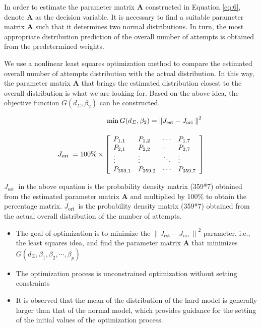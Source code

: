 \documentclass[12pt]{mcmthesis}
\begin{document}
In order to estimate the parameter matrix $ \boldsymbol{A} $ constructed in Equation \ref{eq:6}, denote $ \boldsymbol{A} $ as the decision variable. It is necessary to find a suitable parameter matrix $ \boldsymbol{A} $ such that it determines two normal distributions. In turn, the most appropriate distribution prediction of the overall number of attempts is obtained from the predetermined weights.

We use a nonlinear least squares optimization method to compare the estimated overall number of attempts distribution with the actual distribution. In this way, the parameter matrix $ \boldsymbol{A} $ that brings the estimated distribution closest to the overall distribution is what we are looking for. Based on the above idea, the objective function $ G(d_{\varSigma }, \beta_2) $ can be constructed.

\begin{equation}\label{eq:9}
\begin{array}{r}
	\min G(d_{\varSigma }, \beta_2)=\left\|J_{\text {est}}-J_{\text {ori }}\right\|^2 ~\\
	\vspace{0.2em}\\
	J_{\text {est }}=100\% \times\left[\begin{array}{llll}
		P_{1,1} & P_{1,2} & \cdots & P_{1,7} \\
		P_{2,1} & P_{2,2} & \cdots & P_{2,7} \\
		\vdots & \vdots & \ddots & \vdots \\
		P_{359,1} & P_{359,2} & \cdots & P_{359,7}
	\end{array}\right]
\end{array}
\end{equation}

$ J_{\text {est }} $ in the above equation is the probability density matrix (359*7) obtained from the estimated parameter matrix $ \boldsymbol{A} $ and multiplied by 100\% to obtain the percentage matrix. $ J_{\text {ori }} $ is the probability density matrix (359*7) obtained from the actual overall distribution of the number of attempts.
\begin{itemize}
	\item The goal of optimization is to minimize the $ \left\|J_{\text {est}}-J_{\text {ori }}\right\|^2 $ parameter, i.e., the least squares idea, and find the parameter matrix $ \boldsymbol{A} $ that minimizes $ G(d_{\varSigma },\beta_1, \beta_2, \cdots,\beta_p) $
	\item The optimization process is unconstrained optimization without setting constraints
	\item It is observed that the mean of the distribution of the hard model is generally larger than that of the normal model, which provides guidance for the setting of the initial values of the optimization process.
\end{itemize}
\end{document}
